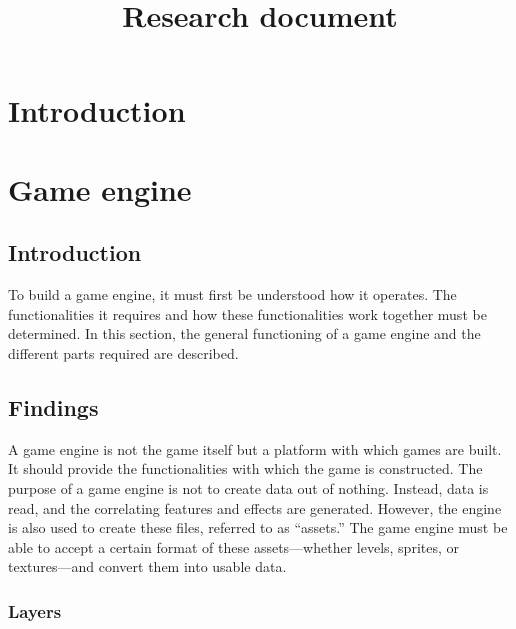 \documentclass{projdoc}
\title{Research document}
\begin{document}
\tablestables
\newpage

\section{Introduction}

\section{Game engine}

\subsection{Introduction}

To build a game engine, it must first be understood how it operates. The
functionalities it requires and how these functionalities work together must be
determined. In this section, the general functioning of a game engine and the
different parts required are described.

\subsection{Findings}

A game engine is not the game itself but a platform with which games are built. It
should provide the functionalities with which the game is constructed. The purpose of
a game engine is not to create data out of nothing. Instead, data is read, and the
correlating features and effects are generated. However, the engine is also used to
create these files, referred to as ``assets.'' The game engine must be able to accept
a certain format of these assets---whether levels, sprites, or textures---and convert
them into usable data.

\subsubsection{Layers}
\end{document}
